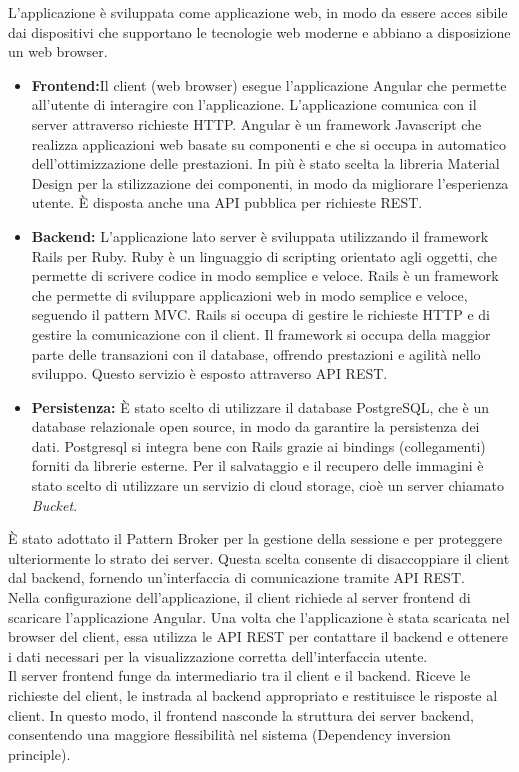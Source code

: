L’applicazione è sviluppata come applicazione web, in modo da essere acces sibile dai dispositivi che supportano le tecnologie web moderne e abbiano a disposizione un web browser.
\begin{itemize}
	\item \large{\textbf{Frontend:}}\newline Il client (web browser) esegue l'applicazione Angular che permette all'utente di interagire con l'applicazione. L'applicazione comunica con il server attraverso richieste HTTP. Angular è un framework Javascript che realizza applicazioni web basate su componenti e che si occupa in automatico dell'ottimizzazione delle prestazioni. In più è stato scelta la libreria Material Design per la stilizzazione dei componenti, in modo da migliorare l'esperienza utente. È disposta anche una API pubblica per richieste REST. 
	\item \large{\textbf{Backend:}}\newline
	L'applicazione lato server è sviluppata utilizzando il framework Rails per Ruby. Ruby è un linguaggio di scripting orientato agli oggetti, che permette di scrivere codice in modo semplice e veloce. Rails è un framework che permette di sviluppare applicazioni web in modo semplice e veloce, seguendo il pattern MVC. Rails si occupa di gestire le richieste HTTP e di gestire la comunicazione con il client. Il framework si occupa della maggior parte delle transazioni con il database, offrendo prestazioni e agilità nello sviluppo. Questo servizio è esposto attraverso API REST.
	\item \large{\textbf{Persistenza:}}\newline
	È stato scelto di utilizzare il database PostgreSQL, che è un database relazionale open source, in modo da garantire la persistenza dei dati. Postgresql si integra bene con Rails grazie ai bindings (collegamenti) forniti da librerie esterne.
	Per il salvataggio e il recupero delle immagini è stato scelto di utilizzare un servizio di cloud storage, cioè un server chiamato \textit{Bucket}.
\end{itemize}

È stato adottato il Pattern Broker per la gestione della sessione e per proteggere ulteriormente lo strato dei server. Questa scelta consente di disaccoppiare il client dal backend, fornendo un'interfaccia di comunicazione tramite API REST.\\

Nella configurazione dell'applicazione, il client richiede al server frontend di scaricare l'applicazione Angular. Una volta che l'applicazione è stata scaricata nel browser del client, essa utilizza le API REST per contattare il backend e ottenere i dati necessari per la visualizzazione corretta dell'interfaccia utente.\\

Il server frontend funge da intermediario tra il client e il backend. Riceve le richieste del client, le instrada al backend appropriato e restituisce le risposte al client. In questo modo, il frontend nasconde la struttura dei server backend, consentendo una maggiore flessibilità nel sistema (Dependency inversion principle).\\